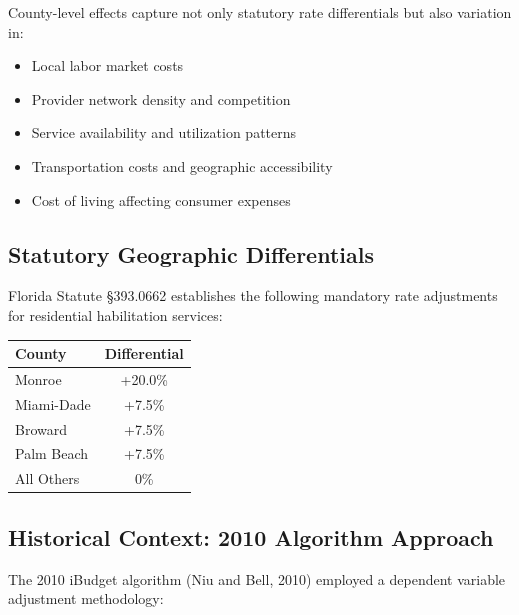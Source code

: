 County-level effects capture not only statutory rate differentials but also variation in:
\begin{itemize}
    \item Local labor market costs
    \item Provider network density and competition
    \item Service availability and utilization patterns
    \item Transportation costs and geographic accessibility
    \item Cost of living affecting consumer expenses
\end{itemize}

\subsection{Statutory Geographic Differentials}

Florida Statute §393.0662 establishes the following mandatory rate adjustments for residential habilitation services:

\begin{center}
\begin{tabular}{|l|c|}
\hline
\textbf{County} & \textbf{Differential} \\
\hline
Monroe & +20.0\% \\
\hline
Miami-Dade & +7.5\% \\
\hline
Broward & +7.5\% \\
\hline
Palm Beach & +7.5\% \\
\hline
All Others & 0\% \\
\hline
\end{tabular}
\end{center}

\subsection{Historical Context: 2010 Algorithm Approach}

The 2010 iBudget algorithm (Niu and Bell, 2010) employed a dependent variable adjustment methodology:

